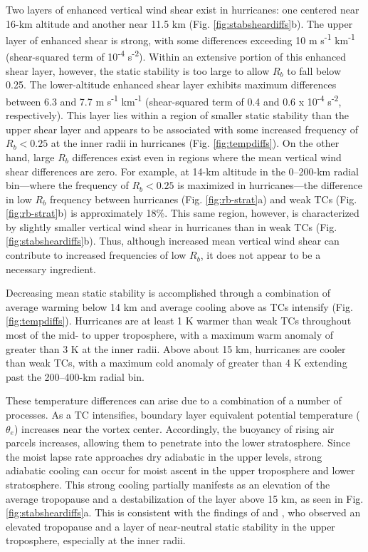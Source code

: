 Two layers of enhanced vertical wind shear exist in hurricanes: one centered near 16-km altitude and another near 11.5 km (Fig. \ref{fig:stabsheardiffs}b).
The upper layer of enhanced shear is strong, with some differences exceeding 10 m s\textsuperscript{-1} km\textsuperscript{-1} (shear-squared term of 10\textsuperscript{-4} s\textsuperscript{-2}).
Within an extensive portion of this enhanced shear layer, however, the static stability is too large to allow $R_b$ to fall below 0.25.
The lower-altitude enhanced shear layer exhibits maximum differences between 6.3 and 7.7 m s\textsuperscript{-1} km\textsuperscript{-1} (shear-squared term of 0.4 and 0.6 x 10\textsuperscript{-4} s\textsuperscript{-2}, respectively).
This layer lies within a region of smaller static stability than the upper shear layer and appears to be associated with some increased frequency of $R_b<0.25$ at the inner radii in hurricanes (Fig. \ref{fig:tempdiffs}).
On the other hand, large $R_b$ differences exist even in regions where the mean vertical wind shear differences are zero.
For example, at 14-km altitude in the 0–200-km radial bin---where the frequency of $R_b<0.25$ is maximized in hurricanes---the difference in low $R_b$ frequency between hurricanes (Fig. \ref{fig:rb-strat}a) and weak TCs (Fig. \ref{fig:rb-strat}b) is approximately 18\%.
This same region, however, is characterized by slightly smaller vertical wind shear in hurricanes than in weak TCs (Fig. \ref{fig:stabsheardiffs}b).
Thus, although increased mean vertical wind shear can contribute to increased frequencies of low $R_b$, it does not appear to be a necessary ingredient.

Decreasing mean static stability is accomplished through a combination of average warming below 14 km and average cooling above as TCs intensify (Fig. \ref{fig:tempdiffs}).
Hurricanes are at least 1 K warmer than weak TCs throughout most of the mid- to upper troposphere, with a maximum warm anomaly of greater than 3 K at the inner radii.
Above about 15 km, hurricanes are cooler than weak TCs, with a maximum cold anomaly of greater than 4 K extending past the 200--400-km radial bin.

These temperature differences can arise due to a combination of a number of processes.
As a TC intensifies, boundary layer equivalent potential temperature ($\theta_e$) increases near the vortex center.
Accordingly, the buoyancy of rising air parcels increases, allowing them to penetrate into the lower stratosphere.
Since the moist lapse rate approaches dry adiabatic in the upper levels, strong adiabatic cooling can occur for moist ascent in the upper troposphere and lower stratosphere.
This strong cooling partially manifests as an elevation of the average tropopause and a destabilization of the layer above 15 km, as seen in Fig. \ref{fig:stabsheardiffs}a.
This is consistent with the findings of \cite{JordanJordan1954} and \cite{Koteswaram1967}, who observed an elevated tropopause and a layer of near-neutral static stability in the upper troposphere, especially at the inner radii.

